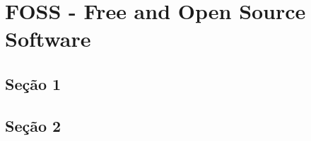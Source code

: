 \chapter[FOSS - Free and Open Source Software]{FOSS - Free and Open Source Software}

\section{Seção 1}

\section{Seção 2}
